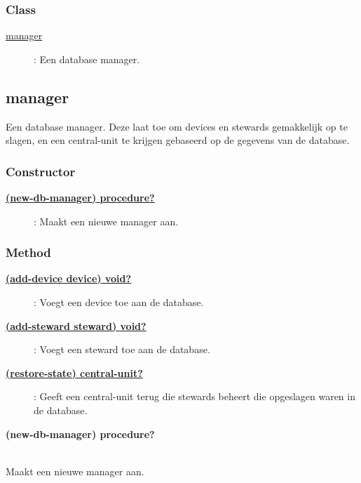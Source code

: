 \documentclass{article}
\newcommand{\ar}{\ding{213} }
\newcommand{\code}[1]{\textcolor{code}{#1}}
\newcommand{\lb}[1][]{\code{(#1}}
\newcommand{\rb}{\code{)}}
\newcommand{\racket}[1]{
	{\color{blue}\textbf{#1}}
}
\begin{document}
\subsubsection{Class}
\begin{description}
	\item[\hyperlink{manager}{manager}] : Een database manager.
\end{description}

\newpage
\hypertarget{manager}{\subsection{manager}}
Een database manager. Deze laat toe om devices en stewards gemakkelijk op te slagen, en een central-unit te krijgen gebaseerd op de gegevens van de database.

\subsubsection{Constructor}
\begin{description}
	\item[\hyperlink{manager:new-db-manager}{\racket{\lb[new-db-manager]\rb \ar \code{procedure?}}}] : Maakt een nieuwe manager aan.
\end{description}

\subsubsection{Method}
\begin{description}
	\item[\hyperlink{manager:add-device}{\racket{\lb[add-device] device\rb \ar \code{void?}}}] : Voegt een device toe aan de database.
	\item[\hyperlink{manager:add-steward}{\racket{\lb[add-steward] steward\rb \ar \code{void?}}}] : Voegt een steward toe aan de database.
	\item[\hyperlink{manager:restore-state}{\racket{\lb[restore-state]\rb \ar \code{central-unit?}}}] : Geeft een central-unit terug die stewards beheert die opgeslagen waren in de database.
\end{description}

\begin{framed}
	\hypertarget{manager:new-db-manager}{\racket{\lb[new-db-manager]\rb \ar \code{procedure?}}}
	\\Maakt een nieuwe manager aan.
\end{framed}
\end{document}
